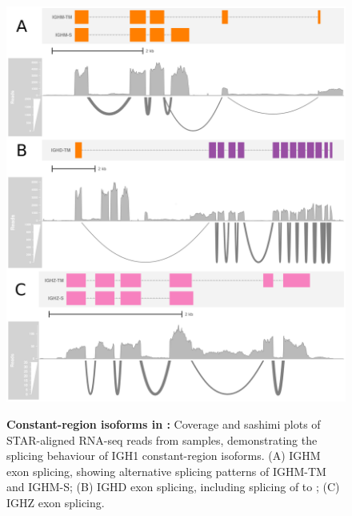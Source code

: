 			\begin{figure}
	\includegraphics[width=\textwidth]{_Figures/png/xma-locus-sashimi}
	\begin{subfigure}{0em}
        \label{fig:xma-locus-sashimi-m}
    \end{subfigure}
    \begin{subfigure}{0em}
        \label{fig:xma-locus-sashimi-d}
    \end{subfigure}
    \begin{subfigure}{0em}
        \label{fig:xma-locus-sashimi-z}
    \end{subfigure}
	\caption[Constant-region isoforms in \Xma]{\textbf{Constant-region isoforms in \Xma:} Coverage and sashimi plots of STAR-aligned RNA-seq reads from \Xma samples, demonstrating the splicing behaviour of IGH1 constant-region isoforms. (A) IGHM exon splicing, showing alternative splicing patterns of IGHM-TM and IGHM-S; (B) IGHD exon splicing, including splicing of  to ; (C) IGHZ exon splicing.}
	\label{fig:xma-locus-sashimi}
	\end{figure}

